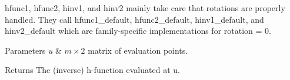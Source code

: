 {\ttfamily hfunc1}, {\ttfamily hfunc2}, {\ttfamily hinv1}, and {\ttfamily hinv2} mainly take care that rotations are properly handled. They call {\ttfamily hfunc1\+\_\+default}, {\ttfamily hfunc2\+\_\+default}, {\ttfamily hinv1\+\_\+default}, and hinv2\+\_\+default which are family-\/specific implementations for {\ttfamily rotation = 0}.


\begin{DoxyParams}{Parameters}
{\em u} & $m \times 2$ matrix of evaluation points. \\
\hline
\end{DoxyParams}
\begin{DoxyReturn}{Returns}
The (inverse) h-\/function evaluated at {\ttfamily u}. 
\end{DoxyReturn}
